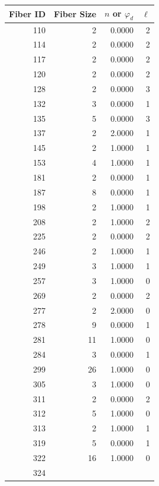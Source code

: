 \documentclass[12pt]{diazessay} %
\begin{document}
\begin{table}[b]
	\centering
	\begin{tabular}{r|r|r|r}
		
		Fiber ID &  Fiber Size &  $n$ or $\varphi_d$ &  $\ell$ \\ \hline
		110 &           2 &             0.0000 &          2 \\      114 &           2 &             0.0000 &          2 \\      117 &           2 &             0.0000 &          2 \\      120 &           2 &             0.0000 &          2 \\      128 &           2 &             0.0000 &          3 \\      132 &           3 &             0.0000 &          1 \\      135 &           5 &             0.0000 &          3 \\      137 &           2 &             2.0000 &          1 \\      145 &           2 &             1.0000 &          1 \\      153 &           4 &             1.0000 &          1 \\      181 &           2 &             0.0000 &          1 \\      187 &           8 &             0.0000 &          1 \\      198 &           2 &             1.0000 &          1 \\      208 &           2 &             1.0000 &          2 \\      225 &           2 &             0.0000 &          2 \\      246 &           2 &             1.0000 &          1 \\      249 &           3 &             1.0000 &          1 \\      257 &           3 &             1.0000 &          0 \\      269 &           2 &             0.0000 &          2 \\      277 &           2 &             2.0000 &          0 \\      278 &           9 &             0.0000 &          1 \\      281 &          11 &             1.0000 &          0 \\      284 &           3 &             0.0000 &          1 \\      299 &          26 &             1.0000 &          0 \\      305 &           3 &             1.0000 &          0 \\      311 &           2 &             0.0000 &          2 \\      312 &           5 &             1.0000 &          0 \\      313 &           2 &             1.0000 &          1 \\      319 &           5 &             0.0000 &          1 \\      322 &          16 &             1.0000 &          0 \\      324 
\end{tabular}
\end{table}
\end{document}
